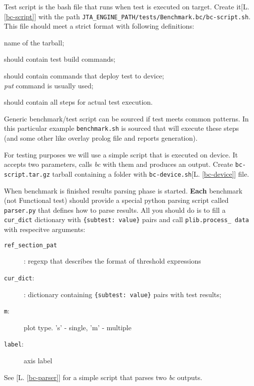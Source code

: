 Test script is the bash file that runs when test is executed on target. Create it[L. \ref{bc-script}] with the path \texttt{JTA\_ENGINE\_PATH/tests/Benchmark.bc/bc-script.sh}. This file should meet a strict format with following definitions:
\begin{description}
\item[\texttt{tarball}] name of the tarball;
\item[\texttt{test\_build}]  should contain test build commands;
\item[\texttt{test\_deploy}]  should contain  commands that deploy test to device; \\
\textit{put} command is usually used;
\item[\texttt{test\_run}] should contain all steps for actual test execution.
\item Generic benchmark/test script can be sourced if test meets common patterns. In this particular example \texttt{benchmark.sh} is sourced that will execute these steps (and some other like overlay prolog file and reports generation).
\end{description}

For testing purposes we will use a simple script that is executed on device. It accepts two parameters, calls \textit{bc} with them and produces an output. Create \texttt{bc-script.tar.gz} tarball containing a folder with \texttt{bc-device.sh}[L. \ref{bc-device}] file.

When benchmark is finished results parsing phase is started. \textbf{Each}  benchmark (not Functional test) should provide a special python parsing script called \texttt{parser.py} that defines how to parse results. All you should do is to fill a \texttt{cur\_dict} dictionary with \texttt{\{subtest: value\}} pairs and call \texttt{plib.process\_ data} with respecitve arguments:
\begin{description}
\item[\texttt{ref\_section\_pat}]: regexp that describes the format of threshold expressions
\item[\texttt{cur\_dict}:]: dictionary containing \texttt{\{subtest: value\}} pairs with test results;
\item[\texttt{m}:] plot type. 's' - single, 'm' - multiple
\item[\texttt{label}:] axis label
\end{description}

See [L. \ref{bc-parser}] for a simple script that parses two \textit{bc} outputs. 

